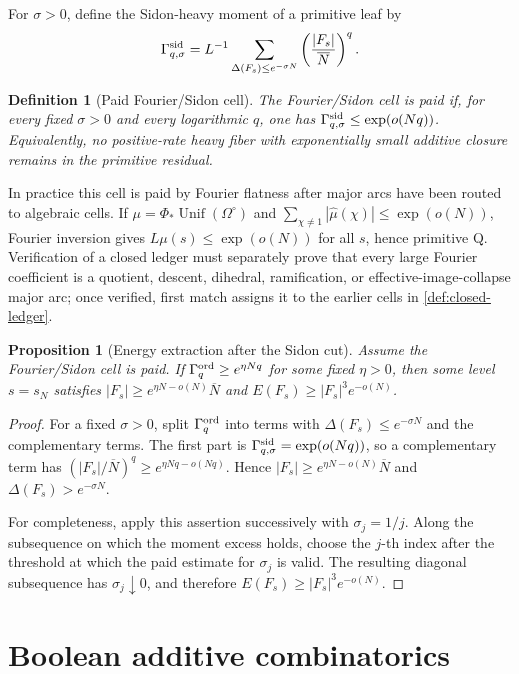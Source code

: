 \documentclass[11pt,a4paper]{amsart}
\numberwithin{equation}{section}
\newtheorem{proposition}[theorem]{Proposition}
\newtheorem{definition}[theorem]{Definition}
\theoremstyle{remark}
\newcommand{\OmegaC}{\Omega^{\circ}}
\newcommand{\Gord}{\Gamma^{\rm ord}}
\newcommand{\Gsid}{\Gamma^{\rm sid}}
\newcommand{\barN}{\overline N}
\begin{document}
For \(\sigma>0\), define the Sidon-heavy moment of a primitive leaf by
\[
        \Gsid_{q,\sigma}
        =L^{-1}\sum_{\Delta(F_s)\le e^{-\sigma N}}
        \left(\frac{|F_s|}{\barN}\right)^q .
\]

\begin{definition}[Paid Fourier/Sidon cell]\label{def:sidon-paid}
The Fourier/Sidon cell is paid if, for every fixed \(\sigma>0\) and every logarithmic \(q\), one has \(\Gsid_{q,\sigma}\le\exp(o(Nq))\).  Equivalently, no positive-rate heavy fiber with exponentially small additive closure remains in the primitive residual.
\end{definition}

In practice this cell is paid by Fourier flatness after major arcs have been routed to algebraic cells.  If \(\mu=\Phi_*\operatorname{Unif}(\OmegaC)\) and \(\sum_{\chi\ne1}|\widehat\mu(\chi)|\le\exp(o(N))\), Fourier inversion gives \(L\mu(s)\le\exp(o(N))\) for all \(s\), hence primitive Q.  Verification of a closed ledger must separately prove that every large Fourier coefficient is a quotient, descent, dihedral, ramification, or effective-image-collapse major arc; once verified, first match assigns it to the earlier cells in \cref{def:closed-ledger}.

\begin{proposition}[Energy extraction after the Sidon cut]\label{prop:energy-extract}
Assume the Fourier/Sidon cell is paid.  If \(\Gord_q\ge e^{\eta Nq}\) for some fixed \(\eta>0\), then some level \(s=s_N\) satisfies \(|F_s|\ge e^{\eta N-o(N)}\barN\) and \(E(F_s)\ge |F_s|^3e^{-o(N)}\).
\end{proposition}

\begin{proof}
For a fixed \(\sigma>0\), split \(\Gord_q\) into terms with
\(\Delta(F_s)\le e^{-\sigma N}\) and the complementary terms.  The first
part is \(\Gsid_{q,\sigma}=\exp(o(Nq))\), so a complementary term has
\((|F_s|/\barN)^q\ge e^{\eta Nq-o(Nq)}\).  Hence
\(|F_s|\ge e^{\eta N-o(N)}\barN\) and
\(\Delta(F_s)>e^{-\sigma N}\).

For completeness, apply this assertion successively with
\(\sigma_j=1/j\).  Along the subsequence on which the moment excess holds,
choose the \(j\)-th index after the threshold at which the paid estimate
for \(\sigma_j\) is valid.  The resulting diagonal subsequence has
\(\sigma_j\downarrow0\), and therefore
\(E(F_s)\ge |F_s|^3e^{-o(N)}\).
\end{proof}

\section{Boolean additive combinatorics}\label{sec:bsg}
\end{document}
